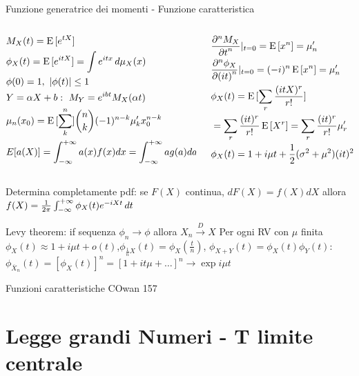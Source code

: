 \begin{frame}{Funzione generatrice dei momenti - Funzione caratteristica}
\begin{columns}[T]
	\begin{column}{0.4\textwidth}
		\begin{align*}
		&M_X(t)=\E{[\exp{tX}]}\\
		&\phi_X(t)=\E{[\exp{itX}]}=\int\exp{itx}\,d\mu_X(x)\\
		&\phi(0)=1,\ |\phi(t)|\leq1\\
		&Y=\alpha X+b:\ M_Y=\exp{ibt}M_X(\alpha t)\\
		&\mu_n(x_0)=\E{[\sum_k^n]}\binom{n}{k}(-1)^{n-k}\mu'_kx_0^{n-k}\\
		&E[a(X)]=\intsinf{}a(x)f(x)dx=\intsinf{}ag(a)da
		\end{align*}
	\end{column}
	\begin{column}{0.6\textwidth}
		\begin{align*}
		&\PDyn{t}{M_X}{n}|_{t=0}=\E{[x^n]}=\mu_n'\\
		&\PDyn{(it)}{\phi_X}{n}|_{t=0}=(-i)^n\E{[x^n]}=\mu_n'\\
		&\phi_X(t)=\E{[\sum_r\frac{(itX)^r}{r!}]}\\
		&=\sum_r\frac{(it)^r}{r!}\E{[X^r]}=\sum_r\frac{(it)^r}{r!}\mu_r'\\
		&\phi_X(t)=1+i\mu t+\frac{1}{2}(\sigma^2+\mu^2)(it)^2
		\end{align*}
	\end{column}
\end{columns}
Determina completamente pdf: se $F(X)$ continua, $dF(X)=f(X)dX$ allora $f(X)=\frac{1}{2\pi}\intsinf{}\phi_X(t)\exp{-iXt}\,dt$
\begin{block}{Levy theorem: if sequenza $\phi_n\to\phi$ allora $X_n\xrightarrow{D}X$}
Per ogni RV con $\mu$ finita $\phi_X(t)\approx1+i\mu t+o(t)$,$\phi_{\frac{1}{n}X}(t)=\phi_X(\frac{t}{n})$, $\phi_{X+Y}(t)=\phi_X(t)\phi_Y(t)$:
$\phi_{\overline{X}_n}(t)=[\phi_X(t)]^n=[1+it\mu+\ldots]^n\to\exp{i\mu t}$
\end{block}
\end{frame}


\begin{frame}{Funzioni caratteristiche}
COwan 157
\end{frame}

\section{Legge grandi Numeri - T limite centrale}

